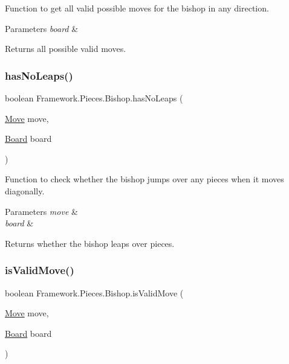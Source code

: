 Function to get all valid possible moves for the bishop in any direction. 
\begin{DoxyParams}{Parameters}
{\em board} & \\
\hline
\end{DoxyParams}
\begin{DoxyReturn}{Returns}
all possible valid moves. 
\end{DoxyReturn}
\hypertarget{class_framework_1_1_pieces_1_1_bishop_a62bca5b0d1b6318f91deed40edf0a8fb}{}\label{class_framework_1_1_pieces_1_1_bishop_a62bca5b0d1b6318f91deed40edf0a8fb} 
\subsubsection{\texorpdfstring{has\+No\+Leaps()}{hasNoLeaps()}}
{\footnotesize\ttfamily boolean Framework.\+Pieces.\+Bishop.\+has\+No\+Leaps (\begin{DoxyParamCaption}\item[{\hyperlink{class_framework_1_1_move}{Move}}]{move,  }\item[{\hyperlink{class_framework_1_1_board}{Board}}]{board }\end{DoxyParamCaption})}

Function to check whether the bishop jumps over any pieces when it moves diagonally. 
\begin{DoxyParams}{Parameters}
{\em move} & \\
\hline
{\em board} & \\
\hline
\end{DoxyParams}
\begin{DoxyReturn}{Returns}
whether the bishop leaps over pieces. 
\end{DoxyReturn}
\hypertarget{class_framework_1_1_pieces_1_1_bishop_aaec1c58dd8488e1f3c139a1a99ac67c7}{}\label{class_framework_1_1_pieces_1_1_bishop_aaec1c58dd8488e1f3c139a1a99ac67c7} 
\subsubsection{\texorpdfstring{is\+Valid\+Move()}{isValidMove()}}
{\footnotesize\ttfamily boolean Framework.\+Pieces.\+Bishop.\+is\+Valid\+Move (\begin{DoxyParamCaption}\item[{\hyperlink{class_framework_1_1_move}{Move}}]{move,  }\item[{\hyperlink{class_framework_1_1_board}{Board}}]{board }\end{DoxyParamCaption})}

